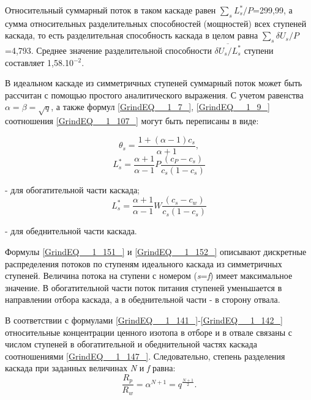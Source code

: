  Относительный суммарный поток в таком каскаде равен $\sum _{s}L_{s}^{*} /P $=299,99, а сумма относительных разделительных способностей (мощностей) всех ступеней каскада, то есть разделительная способность каскада в целом равна $\sum _{s}\delta U_{s} /P $=4,793. Среднее значение разделительной способности $\overline{\delta U_{s} /L_{s}^{*} }$ ступени составляет 1,58$.$10${}^{-2}$.


В идеальном каскаде из симметричных ступеней суммарный поток может быть рассчитан с помощью простого аналитического выражения. С учетом равенства $\alpha =\beta =\sqrt{q} $, а также формул \ref{GrindEQ__1_7_}, \ref{GrindEQ__1_9_} соотношения \ref{GrindEQ__1_107_} могут быть переписаны в виде:

\begin{equation} \label{GrindEQ__1_150_} 
\theta _{s} =\frac{1+(\alpha -1)c_{s} }{\alpha +1} ,                            
\end{equation} 
\begin{equation} \label{GrindEQ__1_151_} 
L_{s}^{*} =\frac{\alpha +1}{\alpha -1} P\frac{(c_{P} -c_{s} )}{c_{s} (1-c_{s} )}  
\end{equation} 

- для обогатительной части каскада; 
\begin{equation} \label{GrindEQ__1_152_} 
L_{s}^{*} =\frac{\alpha +1}{\alpha -1} W\frac{(c_{s} -c_{w} )}{c_{s} (1-c_{s} )}  
\end{equation} 

- для обеднительной части каскада.

Формулы \ref{GrindEQ__1_151_} и \ref{GrindEQ__1_152_} описывают дискретные распределения потоков по ступеням идеального каскада из симметричных ступеней. Величина потока на ступени с номером (\textit{s}=\textit{f}) имеет максимальное значение. В обогатительной части поток питания ступеней уменьшается в направлении отбора каскада, а в обеднительной части - в сторону отвала.

 В соответствии с формулами \ref{GrindEQ__1_141_}-\ref{GrindEQ__1_142_} относительные концентрации ценного изотопа в отборе и в отвале связаны с числом ступеней в обогатительной и обеднительной частях каскада соотношениями \ref{GrindEQ__1_147_}. Следовательно, степень разделения каскада при заданных величинах \textit{N} и \textit{f} равна:
\begin{equation} \label{GrindEQ__1_153_} 
\frac{R_{p} }{R_{w} } =\alpha ^{N+1} =q^{\frac{N+1}{2} } .                         
\end{equation} 

